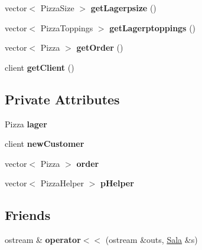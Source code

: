 \begin{CompactItemize}
\item 
\hypertarget{class_sala_3b0fc00a14ac87f5c78a4ec2f508d67b}{
vector$<$ Pizza\-Size $>$ {\bf get\-Lagerpsize} ()}
\label{class_sala_3b0fc00a14ac87f5c78a4ec2f508d67b}

\item 
\hypertarget{class_sala_aeb754b87d63d395a61539294cbdf064}{
vector$<$ Pizza\-Toppings $>$ {\bf get\-Lagerptoppings} ()}
\label{class_sala_aeb754b87d63d395a61539294cbdf064}

\item 
\hypertarget{class_sala_71e41a58a2a9c2d1927676693909a42c}{
vector$<$ Pizza $>$ {\bf get\-Order} ()}
\label{class_sala_71e41a58a2a9c2d1927676693909a42c}

\item 
\hypertarget{class_sala_a1300ce1d3137fc3bd1b2938612faa1b}{
client {\bf get\-Client} ()}
\label{class_sala_a1300ce1d3137fc3bd1b2938612faa1b}

\end{CompactItemize}
\subsection*{Private Attributes}
\begin{CompactItemize}
\item 
\hypertarget{class_sala_0f90fe5c344e62852b747ecbdc5b5d90}{
Pizza {\bf lager}}
\label{class_sala_0f90fe5c344e62852b747ecbdc5b5d90}

\item 
\hypertarget{class_sala_d6980eaf5555befe23d2271575d6d9cb}{
client {\bf new\-Customer}}
\label{class_sala_d6980eaf5555befe23d2271575d6d9cb}

\item 
\hypertarget{class_sala_70a17ffa722a3985b86d30b034ad06d7}{
vector$<$ Pizza $>$ {\bf order}}
\label{class_sala_70a17ffa722a3985b86d30b034ad06d7}

\item 
\hypertarget{class_sala_4b1abb1f80ebc80a2334733ae62acde2}{
vector$<$ Pizza\-Helper $>$ {\bf p\-Helper}}
\label{class_sala_4b1abb1f80ebc80a2334733ae62acde2}

\end{CompactItemize}
\subsection*{Friends}
\begin{CompactItemize}
\item 
\hypertarget{class_sala_b32b27b19243c1cf7bcfffe604ea1736}{
ostream \& {\bf operator$<$$<$} (ostream \&outs, \hyperlink{class_sala}{Sala} \&s)}
\label{class_sala_b32b27b19243c1cf7bcfffe604ea1736}

\end{CompactItemize}


